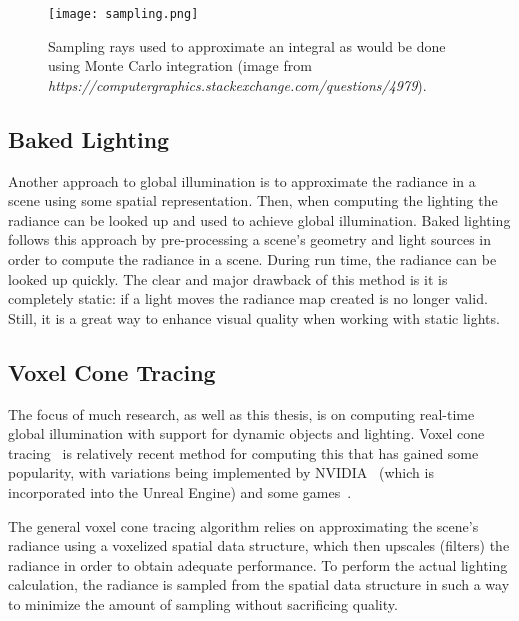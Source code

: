 \begin{figure}[h]
\centering
\texttt{[image: sampling.png]}
\caption{Sampling rays used to approximate an integral as would be done using Monte Carlo integration (image from \textit{https://computergraphics.stackexchange.com/questions/4979}).}
\label{fig:sampling}
\end{figure}

\subsection{Baked Lighting}
Another approach to global illumination is to approximate the radiance in a scene using some spatial representation. Then, when computing the lighting the radiance can be looked up and used to achieve global illumination. Baked lighting follows this approach by pre-processing a scene's geometry and light sources in order to compute the radiance in a scene. During run time, the radiance can be looked up quickly. The clear and major drawback of this method is it is completely static: if a light moves the radiance map created is no longer valid. Still, it is a great way to enhance visual quality when working with static lights.

\subsection{Voxel Cone Tracing}
The focus of much research, as well as this thesis, is on computing real-time global illumination with support for dynamic objects and lighting. Voxel cone tracing~\cite{crassin2011interactive} is relatively recent method for computing this that has gained some popularity, with variations being implemented by NVIDIA~\cite{nvidiavxgi} (which is incorporated into the Unreal Engine) and some games~\cite{mclaren2016cascaded}.

The general voxel cone tracing algorithm relies on approximating the scene's radiance using a voxelized spatial data structure, which then upscales (filters) the radiance in order to obtain adequate performance. To perform the actual lighting calculation, the radiance is sampled from the spatial data structure in such a way to minimize the amount of sampling without sacrificing quality. 


